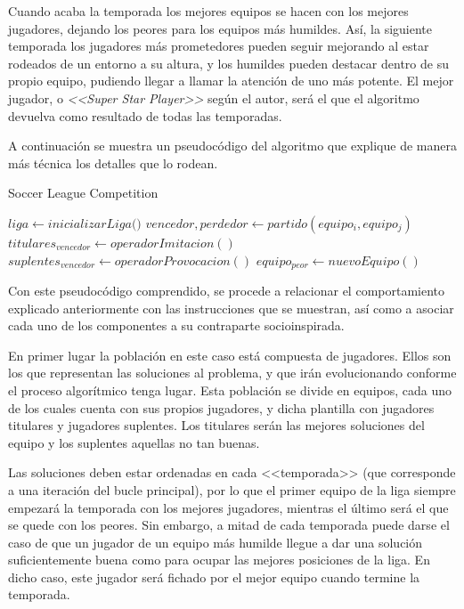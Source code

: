 Cuando acaba la temporada los mejores equipos se hacen con los mejores jugadores, dejando los peores para los equipos más humildes. Así, la siguiente temporada los jugadores más prometedores pueden seguir mejorando al estar rodeados de un entorno a su altura, y los humildes pueden destacar dentro de su propio equipo, pudiendo llegar a llamar la atención de uno más potente. El mejor jugador, o \textit{<<Super Star Player>>} según el autor, será el que el algoritmo devuelva como resultado de todas las temporadas.

A continuación se muestra un pseudocódigo del algoritmo que explique de manera más técnica los detalles que lo rodean.

\begin{algorithm}
	\caption{Soccer League Competition}
	\begin{algorithmic}[1]
		\State $liga \gets \textit{inicializarLiga()}$
		\State $vencedor, perdedor \gets partido(equipo_i, equipo_j)$
		\State $titulares_{vencedor} \gets operadorImitacion()$
		\State $suplentes_{vencedor} \gets operadorProvocacion()$
		\EndFor
		\State $equipo_{peor} \gets nuevoEquipo()$
		\EndIf
		\EndWhile
	\end{algorithmic}
\end{algorithm}

Con este pseudocódigo comprendido, se procede a relacionar el comportamiento explicado anteriormente con las instrucciones que se muestran, así como a asociar cada uno de los componentes a su contraparte socioinspirada.

En primer lugar la población en este caso está compuesta de jugadores. Ellos son los que representan las soluciones al problema, y que irán evolucionando conforme el proceso algorítmico tenga lugar. Esta población se divide en equipos, cada uno de los cuales cuenta con sus propios jugadores, y dicha plantilla con jugadores titulares y jugadores suplentes. Los titulares serán las mejores soluciones del equipo y los suplentes aquellas no tan buenas.

Las soluciones deben estar ordenadas en cada <<temporada>> (que corresponde a una iteración del bucle principal), por lo que el primer equipo de la liga siempre empezará la temporada con los mejores jugadores, mientras el último será el que se quede con los peores. Sin embargo, a mitad de cada temporada puede darse el caso de que un jugador de un equipo más humilde llegue a dar una solución suficientemente buena como para ocupar las mejores posiciones de la liga. En dicho caso, este jugador será fichado por el mejor equipo cuando termine la temporada.

